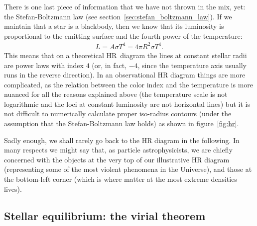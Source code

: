 There is one last piece of information that we have not thrown in the mix, yet:
the Stefan-Boltzmann law (see section~\ref{sec:stefan_boltzmann_law}). If we maintain
that a star is a blackbody, then we know that its luminosity is proportional to the
emitting surface and the fourth power of the temperature:
\begin{align}
  L = A \sigma T^4 = 4 \pi R^2 \sigma T^4.
\end{align}
This means that on a theoretical HR~diagram the lines at constant stellar radii
are power laws with index $4$ (or, in fact, $-4$, since the temperature axis
usually runs in the reverse direction). In an observational HR diagram things
are more complicated, as the relation between the color index and the temperature
is more nuanced for all the reasons explained above (the temperature scale is not
logarithmic and the loci at constant luminosity are not horizontal lines) but it
is not difficult to numerically calculate proper iso-radius contours (under the
assumption that the Stefan-Boltzmann law holds) as shown in figure~\ref{fig:hr}.

Sadly enough, we shall rarely go back to the HR diagram in the following.
In many respects we might say that, as particle astrophysicists, we are chiefly
concerned with the objects at the very top of our illustrative HR diagram
(representing some of the most violent phenomena in the Universe), and those
at the bottom-left corner (which is where matter at the most extreme densities
lives).



\subsection{Stellar equilibrium: the virial theorem}
\label{sec:stars_virial_theorem}


